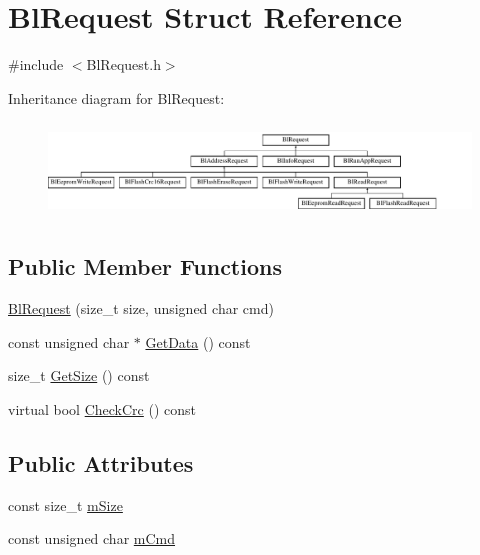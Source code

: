 \hypertarget{struct_bl_request}{\section{Bl\-Request Struct Reference}
\label{struct_bl_request}
}


{\ttfamily \#include $<$Bl\-Request.\-h$>$}

Inheritance diagram for Bl\-Request\-:\begin{figure}[H]
\begin{center}
\leavevmode
\includegraphics[height=2.539683cm]{struct_bl_request}
\end{center}
\end{figure}
\subsection*{Public Member Functions}
\begin{DoxyCompactItemize}
\item 
\hyperlink{struct_bl_request_a3b8671171980b783d25f8491e55e1a58}{Bl\-Request} (size\-\_\-t size, unsigned char cmd)
\item 
const unsigned char $\ast$ \hyperlink{struct_bl_request_aa96361ac208e80204a36870f79f90a83}{Get\-Data} () const 
\item 
size\-\_\-t \hyperlink{struct_bl_request_aaf1d5f14893458a504180196837dcca3}{Get\-Size} () const 
\item 
virtual bool \hyperlink{struct_bl_request_a15810e2347a8b2170030f0c2f98fe4d8}{Check\-Crc} () const 
\end{DoxyCompactItemize}
\subsection*{Public Attributes}
\begin{DoxyCompactItemize}
\item 
const size\-\_\-t \hyperlink{struct_bl_request_afd0174f556d9d4538de850260e8d08a4}{m\-Size}
\item 
const unsigned char \hyperlink{struct_bl_request_a96c808cdbb7f02eeffcea7ebcdb98d0b}{m\-Cmd}
\end{DoxyCompactItemize}


